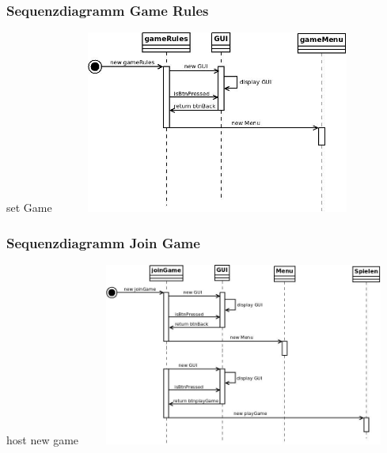 \documentclass{beamer}
\begin{document}
	    \label{Frame3}	
		\begin{frame}
			\frametitle{Sequenzdiagramm Game Rules}
			\begin{block}{set Game}
				\includegraphics[width = 10.8cm, height = 6cm]{aufgabe1/SequenzdiagramGameRules.jpeg}
			\end{block}		
		\end{frame}


	    \label{Frame4}	
		\begin{frame}
			\frametitle{Sequenzdiagramm Join Game}
			\begin{block}{host new game}
				\includegraphics[width = 10.8cm, height = 6cm]{aufgabe1/SequenzdiagrammJoinGame.jpeg}
			\end{block}		
		\end{frame}
\end{document}
